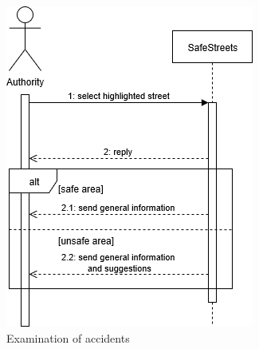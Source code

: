 \begin{figure}
[H]
\centering
\includegraphics[scale=1]{Images/Diagrams/Sequence2.png}
\caption{\label{fig:Sequence2}Examination of accidents}
\end{figure}